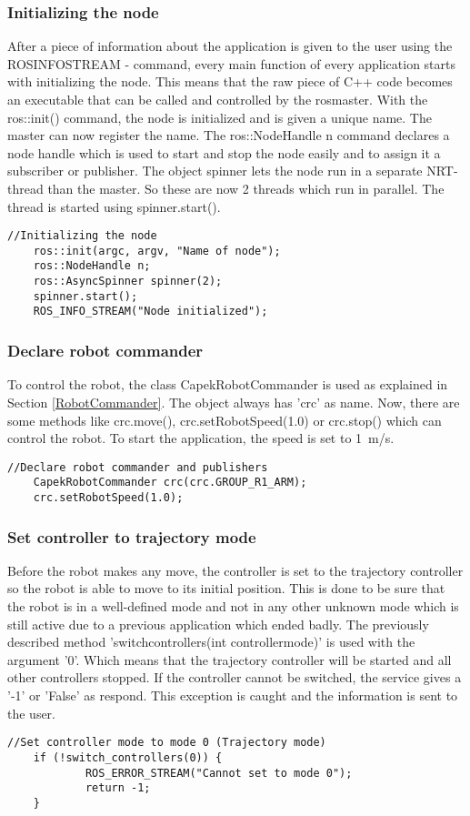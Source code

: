 \documentclass[11pt,a4paper]{report}
\begin{document}
\subsubsection{Initializing the node}
After a piece of information about the application is given to the user using the ROS\textunderscore INFO\textunderscore STREAM - command, every main function of every application starts with initializing the node. This means that the raw piece of C++ code becomes an executable that can be called and controlled by the rosmaster. With the ros::init() command, the node is initialized and is given a unique name. The master can now register the name. The ros::NodeHandle n command declares a node handle which is used to start and stop the node easily and to assign it a subscriber or publisher. The object spinner lets the node run in a separate NRT-thread than the master. So these are now 2 threads which run in parallel. The thread is started using spinner.start().
\begin{verbatim}
//Initializing the node
	ros::init(argc, argv, "Name of node");
	ros::NodeHandle n;
	ros::AsyncSpinner spinner(2);
	spinner.start();
	ROS_INFO_STREAM("Node initialized");
\end{verbatim}

\subsubsection{Declare robot commander}
To control the robot, the class CapekRobotCommander is used as explained in Section \ref{RobotCommander}. The object always has 'crc' as name. Now, there are some methods like crc.move(), crc.setRobotSpeed(1.0) or crc.stop() which can control the robot. To start the application, the speed is set to 1~m/s.
\begin{verbatim}
//Declare robot commander and publishers
	CapekRobotCommander crc(crc.GROUP_R1_ARM);
	crc.setRobotSpeed(1.0);
\end{verbatim}

\subsubsection{Set controller to trajectory mode}\label{SetController}
Before the robot makes any move, the controller is set to the trajectory controller so the robot is able to move to its initial position. This is done to be sure that the robot is in a well-defined mode and not in any other unknown mode which is still active due to a previous application which ended badly.
The previously described method 'switch\textunderscore controllers(int controller\textunderscore mode)' is used with the argument '0'. Which means that the trajectory controller will be started and all other controllers stopped. If the controller cannot be switched, the service gives a '-1' or 'False' as respond. This exception is caught and the information is sent to the user.
\begin{verbatim}
//Set controller mode to mode 0 (Trajectory mode)
	if (!switch_controllers(0)) {
		    ROS_ERROR_STREAM("Cannot set to mode 0");
		    return -1;
	}
\end{verbatim}
\end{document}
